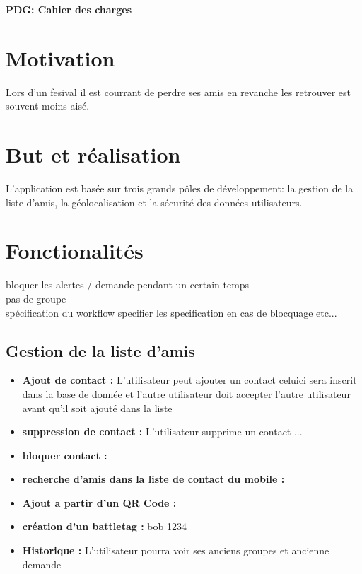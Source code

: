 \documentclass[french]{article}
\begin{document}
	\centering
	\large{\textbf{PDG: Cahier des charges}}
	
	\justify
	
	\section{Motivation}
		 Lors d'un fesival il est courrant de perdre ses amis en revanche les %
		 retrouver est souvent moins aisé. 
	
	\section{But et réalisation}
		L'application est basée sur trois grands pôles de développement: la gestion de la liste d'amis, la géolocalisation et la sécurité des données utilisateurs.		
	
	\section{Fonctionalités}
	
		bloquer les alertes / demande pendant un certain temps \\
		pas de groupe \\
		spécification du workflow specifier les specification en cas de blocquage etc... \\
	
		\subsection{Gestion de la liste d'amis}
		
			\begin{itemize}
				\item \textbf{Ajout de contact : } L'utilisateur peut ajouter un contact celuici sera inscrit dans la base de donnée et l'autre utilisateur doit accepter l'autre utilisateur avant qu'il soit ajouté dans la liste
				\item \textbf{suppression de contact : } L'utilisateur supprime un contact ...
				\item \textbf{bloquer contact : }
				\item \textbf{recherche d'amis dans la liste de contact du mobile : }
				\item \textbf{Ajout a partir d'un QR Code : }
				
				\item \textbf{création d'un battletag : } bob  1234
				
				\item \textbf{Historique : } L'utilisateur pourra voir ses anciens groupes et ancienne demande 
				
				
				
				
				
			\end{itemize}
		
\end{document}

